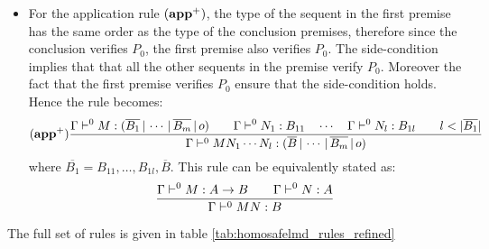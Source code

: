 \begin{itemize}
\item For the application rule $\mathbf{(app^+)}$, the type of the sequent in the first premise has the same order
as the type of the conclusion premises, therefore since the conclusion verifies $P_0$, the first premise also verifies $P_0$.
The side-condition implies that that all the other sequents in the premise verify $P_0$. Moreover the fact
that the first premise verifies $P_0$ ensure that the side-condition holds. Hence the rule becomes:
$$ \mathbf{(app^+)}
    \frac{\displaystyle 
        \Gamma \vdash^0 M : (\overline{B_1} \, | \, \cdots \, | \, \overline{B_m} \, | \, o) \qquad
        \Gamma \vdash^0 N_1 : B_{11} \quad \cdots \quad \Gamma \vdash^0 N_{l} : B_{1l} \qquad l < |\overline{B_1}|
    }{
        \Gamma \vdash^0 M N_1 \cdots N_{l} : (\overline{B} \, | \, \cdots \, | \, \overline{B_m} \, | \, o)
    }
$$
where $\overline{B_1} = B_{11}, \ldots, B_{1l},\overline{B}$.
This rule can be equivalently stated as:
$$ \frac{\displaystyle \Gamma \vdash^0 M : A\rightarrow B
                                        \qquad \Gamma \vdash^{0} N : A
                                   }{\Gamma  \vdash^{0} M N : B}$$
\end{itemize}

The full set of rules is given in table \ref{tab:homosafelmd_rules_refined}

